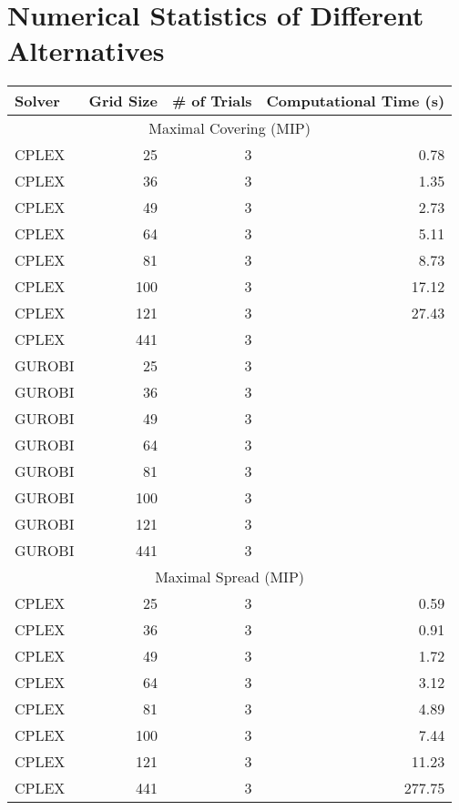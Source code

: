 \documentclass{article}
\begin{document}
	\section{Numerical Statistics of Different Alternatives}
	\begin{table}[]
		\centering
		\begin{tabular}{lrrr}
			\toprule
			Solver & Grid Size & \# of Trials & Computational Time (s) \\
			\midrule
			\multicolumn{4}{c}{Maximal Covering (MIP)}  \\
			CPLEX                       & 25    & 3         & 0.78      \\
			CPLEX                       & 36    & 3         & 1.35      \\
			CPLEX                       & 49    & 3         & 2.73      \\
			CPLEX                       & 64    & 3         & 5.11      \\
			CPLEX                       & 81    & 3         & 8.73      \\
			CPLEX                       & 100   & 3         & 17.12     \\
			CPLEX                       & 121   & 3         & 27.43     \\
			CPLEX                       & 441   & 3         &     \\
			
			GUROBI                      & 25    & 3         &       \\
			GUROBI                      & 36    & 3         &       \\
			GUROBI                      & 49    & 3         &       \\
			GUROBI                      & 64    & 3         &       \\
			GUROBI                      & 81    & 3         &       \\
			GUROBI                      & 100   & 3         &       \\
			GUROBI                      & 121   & 3         &      \\
			GUROBI                      & 441   & 3         &     \\
			
			\multicolumn{4}{c}{Maximal Spread (MIP)}  \\
			CPLEX                       & 25    & 3         & 0.59      \\
			CPLEX                       & 36    & 3         & 0.91      \\
			CPLEX                       & 49    & 3         & 1.72      \\
			CPLEX                       & 64    & 3         & 3.12      \\
			CPLEX                       & 81    & 3         & 4.89      \\
			CPLEX                       & 100   & 3         & 7.44      \\
			CPLEX                       & 121   & 3         & 11.23     \\
			CPLEX                       & 441   & 3         & 277.75    \\
			

\end{tabular}
\end{table}
\end{document}
